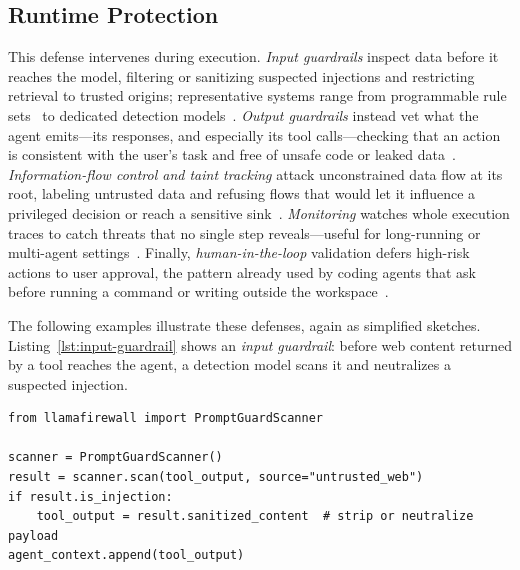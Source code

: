 \subsection{Runtime Protection}

This defense intervenes during execution. \emph{Input guardrails} inspect data before it reaches the model, filtering or sanitizing suspected injections and restricting retrieval to trusted origins; representative systems range from programmable rule sets~\cite{rebedea2023nemo} to dedicated detection models~\cite{llamafirewall,datasentinel}. \emph{Output guardrails} instead vet what the agent emits—its responses, and especially its tool calls—checking that an action is consistent with the user's task and free of unsafe code or leaked data~\cite{shi2025progent,xiang2024guardagent,codeshield}. \emph{Information-flow control and taint tracking} attack unconstrained data flow at its root, labeling untrusted data and refusing flows that would let it influence a privileged decision or reach a sensitive sink~\cite{debenedetti2025camel,costa2025fides,zhu2025melon}. \emph{Monitoring} watches whole execution traces to catch threats that no single step reveals—useful for long-running or multi-agent settings~\cite{kim2026sok}. Finally, \emph{human-in-the-loop} validation defers high-risk actions to user approval, the pattern already used by coding agents that ask before running a command or writing outside the workspace~\cite{github-copilot,cursor}.

The following examples illustrate these defenses, again as simplified sketches. Listing~\ref{lst:input-guardrail} shows an \emph{input guardrail}: before web content returned by a tool reaches the agent, a detection model scans it and neutralizes a suspected injection.

\noindent\begin{minipage}{\linewidth}
\begin{lstlisting}[caption={Input guardrails: a dedicated detection model, in the style of LlamaFirewall/DataSentinel~\cite{llamafirewall,datasentinel}, scoring content before it enters context.}, label={lst:input-guardrail}]
from llamafirewall import PromptGuardScanner

scanner = PromptGuardScanner()
result = scanner.scan(tool_output, source="untrusted_web")
if result.is_injection:
    tool_output = result.sanitized_content  # strip or neutralize payload
agent_context.append(tool_output)
\end{lstlisting}
\end{minipage}

